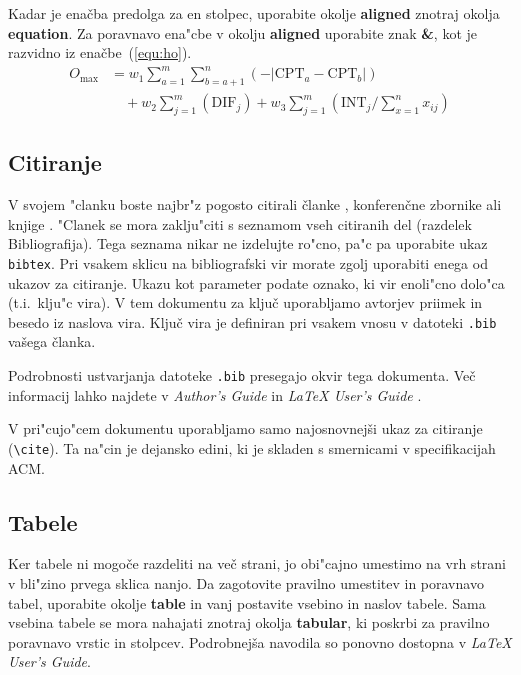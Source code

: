 \documentclass[sigconf,nonacm]{acmart}
\begin{document}
Kadar je enačba predolga za en stolpec, uporabite okolje \textbf{aligned}
znotraj okolja \textbf{equation}.  Za poravnavo ena"cbe v okolju
\textbf{aligned} uporabite znak \textbf{\&}, kot je razvidno iz
enačbe~(\ref{equ:ho}).
%
\begin{equation}
    \begin{aligned}
        O_{\max}& = w_1 \sum_{a=1}^{m} \sum_{b=a+1}^{n} (-\lvert\text{CPT}_a 
        -\text{CPT}_b\rvert)\\ 
        &\quad + w_2 \sum_{j=1}^{m} (\text{DIF}_j) + w_3 \sum_{j=1}^{m} 
        (\text{INT}_j/\sum_{x=1}^{n} x_{ij})
    \end{aligned}
    \label{equ:ho}
\end{equation}

\subsection{Citiranje}

V svojem "clanku boste najbr"z pogosto citirali članke \cite{lecun2015deep,
braams:babel, herlihy:methodology}, konferenčne zbornike
\cite{vrbancic2019transfer, clark:pct} ali knjige \cite{salas:calculus,
Lamport:LaTeX, fister2019computational}.  "Clanek se mora zaklju"citi s
seznamom vseh citiranih del (razdelek Bibliografija).  Tega seznama nikar ne
izdelujte ro"cno, pa"c pa uporabite ukaz \texttt{bibtex}.  Pri vsakem sklicu
na bibliografski vir morate zgolj uporabiti enega od ukazov za citiranje.
Ukazu kot parameter podate oznako, ki vir enoli"cno dolo"ca (t.i.\ klju"c
vira).  V tem dokumentu za ključ uporabljamo avtorjev priimek in besedo iz
naslova vira.  Ključ vira je definiran pri vsakem vnosu v datoteki
\texttt{.bib} vašega članka.

Podrobnosti ustvarjanja datoteke \texttt{.bib} presegajo okvir tega dokumenta.
Več informacij lahko najdete v \emph{Author's Guide} in \emph{\LaTeX{} User's
Guide} \cite{Lamport:LaTeX}.

V pri"cujo"cem dokumentu uporabljamo samo najosnovnejši ukaz za citiranje
(\texttt{\textbackslash{}cite}).  Ta na"cin je dejansko edini, ki je skladen s
smernicami v specifikacijah ACM\@.

\subsection{Tabele}

Ker tabele ni mogoče razdeliti na več strani, jo obi"cajno umestimo na vrh
strani v bli"zino prvega sklica nanjo.  Da zagotovite pravilno umestitev in
poravnavo tabel, uporabite okolje \textbf{table} in vanj postavite vsebino in
naslov tabele.  Sama vsebina tabele se mora nahajati znotraj okolja
\textbf{tabular}, ki poskrbi za pravilno poravnavo vrstic in stolpcev.
Podrobnejša navodila so ponovno dostopna v \emph{\LaTeX{} User's Guide}.
    
\end{document}
